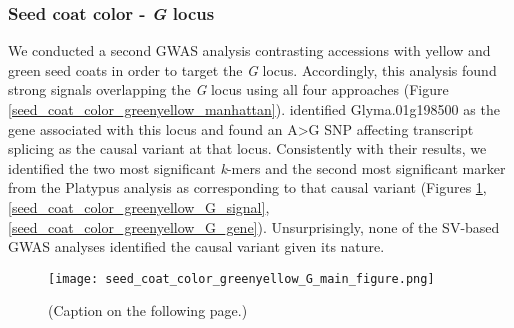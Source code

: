 \subsubsection{Seed coat color - \textit{G} locus}
\label{sv-gwas-main-results-seed-coat-color-g}

We conducted a second GWAS analysis contrasting accessions with yellow and
green seed coats in order to target the \textit{G} locus. Accordingly, this
analysis found strong signals overlapping the \emph{G} locus using all four
approaches (Figure \ref{seed_coat_color_greenyellow_manhattan}).
\cite{wang2018} identified Glyma.01g198500 as the gene associated with
this locus and found an A>G SNP affecting transcript splicing as the causal
variant at that locus.  Consistently with their results, we identified the two
most significant \emph{k}-mers and the second most significant marker from the
Platypus analysis as corresponding to that causal variant (Figures
\ref{seed-coat-color-main-figure},
\ref{seed_coat_color_greenyellow_G_signal},
\ref{seed_coat_color_greenyellow_G_gene}). Unsurprisingly, none of the
SV-based GWAS analyses identified the causal variant given its nature.

\begin{figure}
	\centering
	\texttt{[image: seed\_coat\_color\_greenyellow\_G\_main\_figure.png]}
	\caption[Results of SNP/indel- and \textit{k}-mer-based GWAS at the
	\textit{G} locus for seed coat color]{(Caption on the following page.)}
	\label{seed-coat-color-main-figure}
\end{figure}

